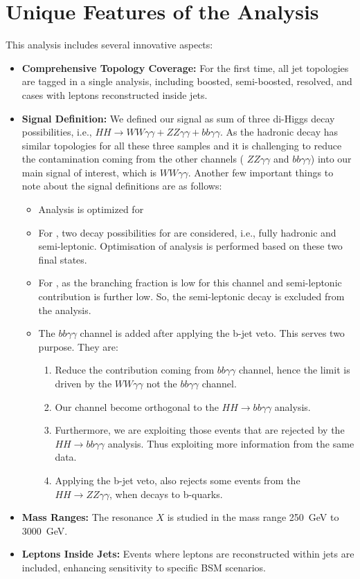\section{Unique Features of the Analysis}
This analysis includes several innovative aspects:
\begin{itemize}
    \item \textbf{Comprehensive Topology Coverage:} For the first time, all jet topologies are tagged in a single analysis,
    including boosted, semi-boosted, resolved, and cases with leptons reconstructed inside jets.
    \item \textbf{Signal Definition:} We defined our signal as sum of three di-Higgs decay possibilities, i.e.,
    \(HH \to WW\gamma\gamma + ZZ\gamma\gamma + bb\gamma\gamma\).  As the hadronic decay has similar topologies for
    all these three samples and it is challenging to reduce the contamination coming from the other channels ( \(ZZ\gamma\gamma\)
    and \( bb\gamma\gamma\)) into our main signal of interest, which is \(WW\gamma\gamma\).
    Another few important things to note about
    the signal definitions are as follows:
    \begin{itemize}
        \item Analysis is optimized for \HH
        \item For \HH, two decay possibilities for \Wboson are considered, i.e., fully hadronic and semi-leptonic.
        Optimisation of analysis is performed based on these two final states.
        \item For \Zboson\Zboson, as the branching fraction is low for this channel and semi-leptonic contribution is further low. So, the semi-leptonic decay is excluded from the analysis.
        \item The \(bb\gamma\gamma\) channel is added after applying the b-jet veto. This serves two purpose. They are:
        \begin{enumerate}
            \item Reduce the contribution coming from \(bb\gamma\gamma\) channel, hence the limit is driven by the \(WW\gamma\gamma\) not the \(bb\gamma\gamma\) channel.
            \item Our channel become orthogonal to the \(HH \rightarrow bb\gamma\gamma\) analysis.
            \item Furthermore, we are exploiting those events that are rejected by the \(HH \rightarrow bb\gamma\gamma\) analysis. Thus exploiting more information from the same data.
            \item Applying the b-jet veto, also rejects some events from the \(HH\rightarrow ZZ\gamma\gamma\), when \Zboson decays to b-quarks.
        \end{enumerate}
    \end{itemize}
    \item \textbf{Mass Ranges:} The resonance \(X\) is studied in the mass range 250~GeV to 3000~GeV.
    \item \textbf{Leptons Inside Jets:} Events where leptons are reconstructed within jets are included, enhancing sensitivity to
    specific BSM scenarios.
\end{itemize}

